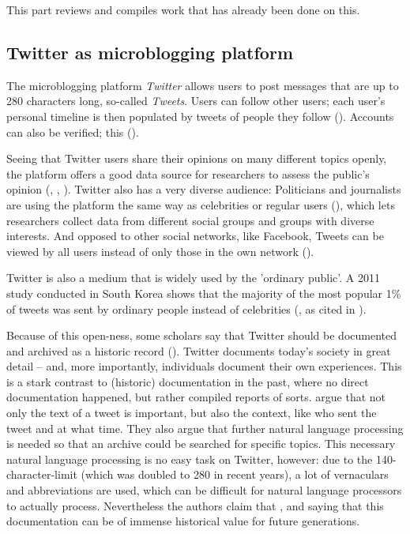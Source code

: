 This part reviews and compiles work that has already been done on this.

\subsection{Twitter as microblogging platform}
The microblogging platform \emph{Twitter} allows users to post messages that are up to 280 characters long, so-called \emph{Tweets}. Users can follow other users; each user's personal timeline is then populated by tweets of people they follow (\cite{thimm_twitter_2012}). Accounts can also be verified; this  (\cite{twitter_inc_about_nodate-1}). 

Seeing that Twitter users share their opinions on many different topics openly, the platform offers a good data source for researchers to assess the public's opinion (\cite{pak2010twitter}, \cite{pfaffenberger2016twitter}, \cite{broniatowski2014twitter}). Twitter also has a very diverse audience: Politicians and journalists are using the platform the same way as celebrities or regular users (\cite{pak2010twitter}), which lets researchers collect data from different social groups and groups with diverse interests. And opposed to other social networks, like Facebook, Tweets can be viewed by all users instead of only those in the own network (\cite{park_does_2013}).

Twitter is also a medium that is widely used by the 'ordinary public'. A 2011 study conducted in South Korea shows that the majority of the most popular 1\% of tweets was sent by ordinary people instead of celebrities (\cite{chang2011structure}, as cited in \cite{park_does_2013}).

Because of this open-ness, some scholars say that Twitter should be documented and archived as a historic record (\cite{risse2014documenting}). Twitter documents today's society in great detail -- and, more importantly, individuals document their own experiences. This is a stark contrast to (historic) documentation in the past, where no direct documentation happened, but rather compiled reports of sorts. \citeauthor{risse2014documenting} argue that not only the text of a tweet is important, but also the context, like who sent the tweet and at what time. They also argue that further natural language processing is needed so that an archive could be searched for specific topics. This necessary natural language processing is no easy task on Twitter, however: due to the 140-character-limit (which was doubled to 280 in recent years), a lot of vernaculars and abbreviations are used, which can be difficult for natural language processors to actually process. Nevertheless the authors claim that  \cite[9]{risse2014documenting}, and saying that this documentation can be of immense historical value for future generations.

